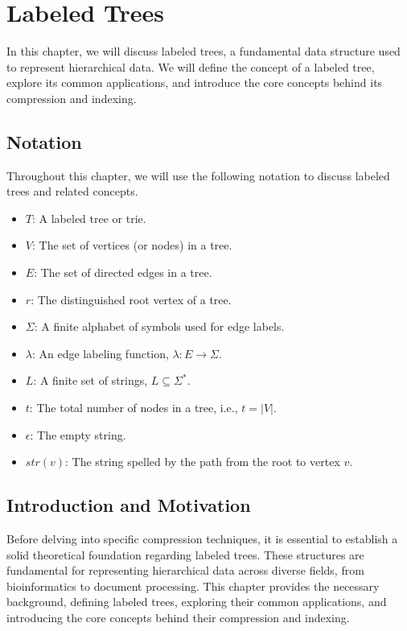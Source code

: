 \section{Labeled Trees} \label{chp:thbg_labeled_tree}
In this chapter, we will discuss labeled trees, a fundamental data structure used to represent hierarchical data. We will define the concept of a labeled tree, explore its common applications, and introduce the core concepts behind its compression and indexing.

\subsection*{Notation}
Throughout this chapter, we will use the following notation to discuss labeled trees and related concepts.
\begin{itemize}
    \item $T$: A labeled tree or trie.
    \item $V$: The set of vertices (or nodes) in a tree.
    \item $E$: The set of directed edges in a tree.
    \item $r$: The distinguished root vertex of a tree.
    \item $\Sigma$: A finite alphabet of symbols used for edge labels.
    \item $\lambda$: An edge labeling function, $\lambda: E \to \Sigma$.
    \item $L$: A finite set of strings, $L \subseteq \Sigma^*$.
    \item $t$: The total number of nodes in a tree, i.e., $t = |V|$.
    \item $\epsilon$: The empty string.
    \item $str(v)$: The string spelled by the path from the root to vertex $v$.
\end{itemize}

\subsection{Introduction and Motivation}
Before delving into specific compression techniques, it is essential to establish a solid theoretical foundation regarding labeled trees. These structures are fundamental for representing hierarchical data across diverse fields, from bioinformatics to document processing. This chapter provides the necessary background, defining labeled trees, exploring their common applications, and introducing the core concepts behind their compression and indexing. 

